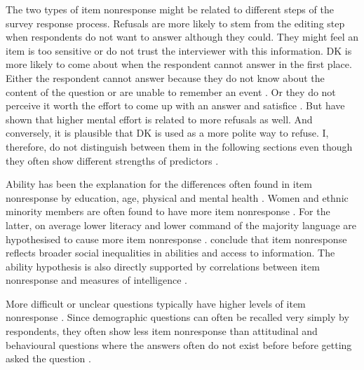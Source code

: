 \documentclass[a4paper,12pt]{article}
\begin{document}
The two types of item nonresponse might be related to different steps of the survey response process. Refusals are more likely to stem from the editing step when respondents do not want to answer although they could. They might feel an item is too sensitive or do not trust the interviewer with this information. DK is more likely to come about when the respondent cannot answer in the first place. Either the respondent cannot answer because they do not know about the content of the question or are unable to remember an event \citep{beattyAnswerNotAnwer2002, turnerCanResponseLatencies2015}. Or they do not perceive it worth the effort to come up with an answer and satisfice \citep{krosnickResponseStrategiesCoping1991}. But \citet{shoemakerItemNonresponseDistinguishing2002} have shown that higher mental effort is related to more refusals as well. And conversely, it is plausible that DK is used as a more polite way to refuse. I, therefore, do not distinguish between them in the following sections even though they often show different strengths of predictors \citep{silberEffectsQuestionRespondent2021}.

Ability has been the explanation for the differences often found in item nonresponse by education, age, physical and mental health \citep{colsherDataQualityAge1989, pickeryImpactRespondentInterviewer1998, deleeuwPreventionTreatmentItem2003, messerDeterminantsItemNonresponse2012, silberEffectsQuestionRespondent2021}. Women and ethnic minority members are often found to have more item nonresponse \citep{kupekDeterminantsItemNonresponse1998, pickeryImpactRespondentInterviewer1998}. For the latter, on average lower literacy and lower command of the majority language are hypothesised to cause more item nonresponse \citep{kupekDeterminantsItemNonresponse1998}. \citet{meitingerPowerCultureItem2020} conclude that item nonresponse reflects broader social inequalities in abilities and access to information. The ability hypothesis is also directly supported by correlations between item nonresponse and measures of intelligence \citep{hedengrenDogThatDidn2012}.

More difficult or unclear questions typically have higher levels of item nonresponse \citep{holbrookImpactQuestionRespondent2006, messerDeterminantsItemNonresponse2012, holbrookInterviewerErrorsHelp2016, olsonEffectsRespondentQuestion2019}. Since demographic questions can often be recalled very simply by respondents, they often show less item nonresponse than attitudinal and behavioural questions where the answers often do not exist before before getting asked the question \citep{olsonEffectsRespondentQuestion2019, silberEffectsQuestionRespondent2021}.
\end{document}
